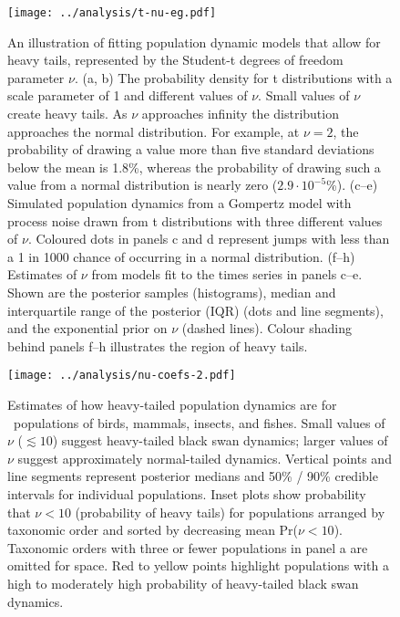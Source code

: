 \begin{figure}[htbp]
\begin{center}
\texttt{[image: ../analysis/t-nu-eg.pdf]}
\caption{
An illustration of fitting population dynamic models that allow for heavy
tails, represented by the Student-t degrees of freedom parameter $\nu$. (a, b)
The probability density for t distributions with a scale parameter of 1 and
different values of $\nu$. Small values of $\nu$ create heavy tails. As $\nu$
approaches infinity the distribution approaches the normal distribution. For
example, at $\nu = 2$, the probability of drawing a value more than five
standard deviations below the mean is 1.8\%, whereas the probability of drawing
such a value from a normal distribution is nearly zero ($2.9\cdot10^{-5}$\%).
(c--e) Simulated population dynamics from a Gompertz model with process noise
drawn from t distributions with three different values of $\nu$. Coloured dots
in panels c and d represent jumps with less than a 1 in 1000 chance of
occurring in a normal distribution. (f--h) Estimates of $\nu$ from models fit
to the times series in panels c--e. Shown are the posterior samples
(histograms), median and interquartile range of the posterior (IQR) (dots and
line segments), and the exponential prior on $\nu$ (dashed lines). Colour
shading behind panels f--h illustrates the region of heavy tails.}
\label{fig:didactic}
\end{center}
\end{figure}

\clearpage

\begin{figure}[htbp]
\begin{center}
\texttt{[image: ../analysis/nu-coefs-2.pdf]}
\caption{
Estimates of how heavy-tailed population dynamics are for \nuCoefPopN\
populations of birds, mammals, insects, and fishes. Small values of $\nu$
($\lesssim 10$) suggest heavy-tailed black swan dynamics; larger values of
$\nu$ suggest approximately normal-tailed dynamics. Vertical points and line
segments represent posterior medians and 50\% / 90\% credible intervals for
individual populations. Inset plots show probability that $\nu < 10$
(probability of heavy tails) for populations arranged by taxonomic order and
sorted by decreasing mean Pr($\nu < 10$). Taxonomic orders with three or fewer
populations in panel a are omitted for space. Red to yellow points highlight
populations with a high to moderately high probability of heavy-tailed black
swan dynamics.
}
\label{fig:nu-coefs}
\end{center}
\end{figure}
\clearpage

